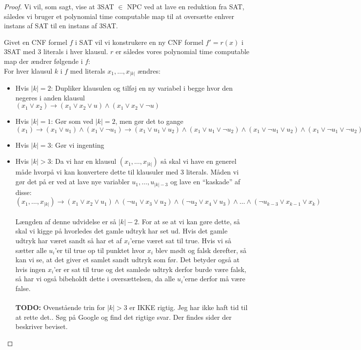 \begin{proof} Vi vil, som sagt, vise at 3SAT $\in$ NPC ved at lave en reduktion
fra SAT, således vi bruger et polynomial time computable map til at oversætte
enhver instans af SAT til en instans af 3SAT.

Givet en CNF formel $f$ i SAT vil vi konstrukere en ny CNF formel $f' = r(x)$
i 3SAT med 3 literals i hver klausul. $r$ er således vores polynomial time
computable map der ændrer følgende i $f$:\\

For hver klausul $k$ i $f$ med literals $x_1, \hdots, x_{|k|}$ ændres:
\begin{itemize} \item Hvis $|k| = 2$: Dupliker klausulen og tilføj en ny
variabel i begge hvor den negeres i anden klausul \\ $(x_1 \vee x_2) \rightarrow
(x_1 \vee x_2 \vee u) \wedge (x_1 \vee x_2 \vee \neg u)$ \item Hvis $|k| = 1$:
Gør som ved $|k| = 2$, men gør det to gange \\ $(x_1) \rightarrow (x_1 \vee
u_1) \wedge (x_1 \vee \neg u_1) \rightarrow (x_1 \vee u_1 \vee u_2) \wedge (x_1
\vee u_1 \vee \neg u_2) \wedge (x_1 \vee \neg u_1 \vee u_2) \wedge (x_1 \vee
\neg u_1 \vee \neg u_2)$ \item Hvis $|k| = 3$: Gør vi ingenting \item Hvis $|k|
> 3$: Da vi har en klausul $(x_1,\hdots,x_{|k|})$ så skal vi have en generel
måde hvorpå vi kan konvertere dette til klausuler med 3 literals. Måden vi
gør det på er ved at lave nye variabler $u_1,\hdots,u_{|k|-3}$ og lave en
``kaskade'' af disse:\\ $(x_1,\hdots,x_{|k|}) \rightarrow (x_1 \vee x_2 \vee
u_1) \wedge (\neg u_1 \vee x_3 \vee u_2) \wedge (\neg u_2 \vee x_4 \vee u_3 )
\wedge \hdots \wedge (\neg u_{k-3} \vee x_{k-1} \vee x_{k} ) $ \\ ~\\ Længden
af denne udvidelse er så $|k|-2$. For at se at vi kan gøre dette, så skal
vi kigge på hvorledes det gamle udtryk har set ud. Hvis det gamle udtryk har
været sandt så har et af $x_i$'erne været sat til true. Hvis vi så sætter
alle $u_i$'er til true op til punktet hvor $x_i$ blev mødt og falsk derefter,
så kan vi se, at det giver et samlet sandt udtryk som før. Det betyder også
at hvis ingen $x_i$'er er sat til true og det samlede udtryk derfor burde være
falsk, så har vi også bibeholdt dette i oversættelsen, da alle $u_i$'erne
derfor må være false.\\ ~\\ \textbf{TODO:} Ovenstående trin for $|k| > 3$ er
IKKE rigtig. Jeg har ikke haft tid til at rette det.. Søg på Google og find
det rigtige svar. Der findes sider der beskriver beviset. \end{itemize}


\end{proof}
